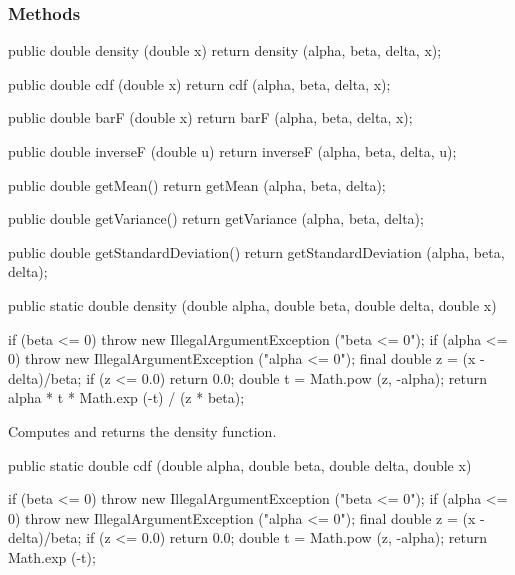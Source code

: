 \subsubsection* {Methods}
\begin{code}\begin{hide}

   public double density (double x) {
      return density (alpha, beta, delta, x);
   }

   public double cdf (double x) {
      return cdf (alpha, beta, delta, x);
   }

   public double barF (double x) {
      return barF (alpha, beta, delta, x);
   }

   public double inverseF (double u) {
      return inverseF (alpha, beta, delta, u);
   }

   public double getMean() {
      return getMean (alpha, beta, delta);
   }

   public double getVariance() {
      return getVariance (alpha, beta, delta);
   }

   public double getStandardDeviation() {
      return getStandardDeviation (alpha, beta, delta);
   }\end{hide}

   public static double density (double alpha, double beta, double delta,
                                 double x)\begin{hide} {
      if (beta <= 0)
         throw new IllegalArgumentException ("beta <= 0");
      if (alpha <= 0)
         throw new IllegalArgumentException ("alpha <= 0");
      final double z = (x - delta)/beta;
      if (z <= 0.0)
         return 0.0;
      double t = Math.pow (z, -alpha);
      return  alpha * t * Math.exp (-t) / (z * beta);
   }\end{hide}
\end{code}
\begin{tabb} Computes and returns the density function.
\end{tabb}
\begin{code}

   public static double cdf (double alpha, double beta, double delta,
                             double x)\begin{hide} {
      if (beta <= 0)
         throw new IllegalArgumentException ("beta <= 0");
      if (alpha <= 0)
         throw new IllegalArgumentException ("alpha <= 0");
      final double z = (x - delta)/beta;
      if (z <= 0.0)
         return 0.0;
      double t = Math.pow (z, -alpha);
      return  Math.exp (-t);
   }\end{hide}
\end{code}
